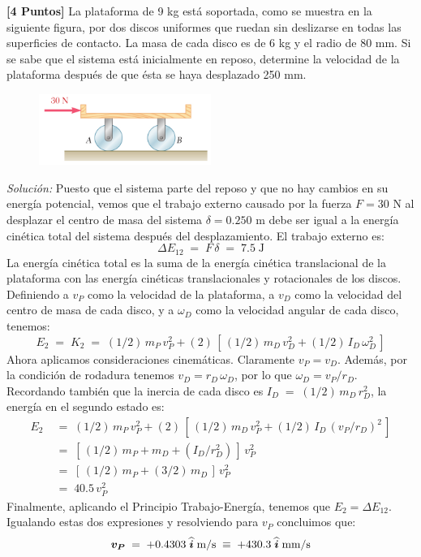 \documentclass[ a4paper, twoside, 11pt]{article}
\begin{document}
\begin{problem}
\end{problem}
\fullskip

\begin{problem}
\textbf{[4 Puntos]} La plataforma de 9 kg est\'a soportada, como se muestra en la siguiente figura, por dos discos uniformes que ruedan sin deslizarse en todas las superficies de contacto. La masa de cada disco es de 6 kg y el radio de 80 mm. Si se sabe que el sistema est\'a inicialmente en reposo, determine la velocidad de la plataforma despu\'es de que \'esta se haya desplazado 250 mm. 

\begin{figure}[htb]
\centering
\includegraphics[width=0.5\textwidth]{problema-03.jpg}
\end{figure}

\emph{Soluci\'on:} Puesto que el sistema parte del reposo y que no hay cambios en su energ\'ia potencial, vemos que el trabajo externo causado por la fuerza $F = 30$ N al desplazar el centro de masa del sistema $\delta = 0.250$ m debe ser igual a la energ\'ia cin\'etica total del sistema despu\'es del desplazamiento. El trabajo externo es: 
\[
\Delta E_{12} \; = \; F \, \delta \; = \; 7.5 \; \text{J}
\]
La energ\'ia cin\'etica total es la suma de la energ\'ia cin\'etica translacional de la plataforma con las energ\'ia cin\'eticas translacionales y rotacionales de los discos. Definiendo a $v_P$ como la velocidad de la plataforma, a $v_D$ como la velocidad del centro de masa de cada disco, y a $\omega_D$ como la velocidad angular de cada disco, tenemos: 
\[
E_2 \; = \; K_2 \; = \; 
(1/2) \, m_P \, v_P^2 + (2) \, [ \, (1/2) \, m_D \, v_D^2 + (1/2) \, I_D \, \omega_D^2 \, ]
\]
Ahora aplicamos consideraciones cinem\'aticas. Claramente $v_P = v_D$. Adem\'as, por la condici\'on de rodadura tenemos $v_D = r_D \, \omega_D$, por lo que $\omega_D = v_P / r_D$. Recordando tambi\'en que la inercia de cada disco es $I_D \; = \; (1/2) \, m_D \, r_D^2$, la energ\'ia en el segundo estado es: 
\begin{align*}
E_2 \;
& = \; (1/2) \, m_P \, v_P^2 + (2) \, [ \, (1/2) \, m_D \, v_P^2 + (1/2) \, I_D \, ( v_P / r_D )^2 \, ] \\
& = \; [ \, (1/2) \, m_P + m_D + ( I_D / r_D^2 ) \, ] \, v_P^2 \\
& = \; [ \, (1/2) \, m_P + (3/2) \, m_D \, ] \, v_P^2 \\
& = \; 40.5 \, v_P^2
\end{align*}
Finalmente, aplicando el Principio Trabajo-Energ\'ia, tenemos que $E_2 = \Delta E_{12}$. Igualando estas dos expresiones y resolviendo para $v_P$ concluimos que: 
\[
{\boldsymbol{v_P}} \; = \; +0.4303 \; {\boldsymbol{\widehat{i}}} \; \text{m/s}
\; \equiv \; +430.3 \; {\boldsymbol{\widehat{i}}} \; \text{mm/s}
\]
\QED

\end{problem}
\fullskip
\end{document}
